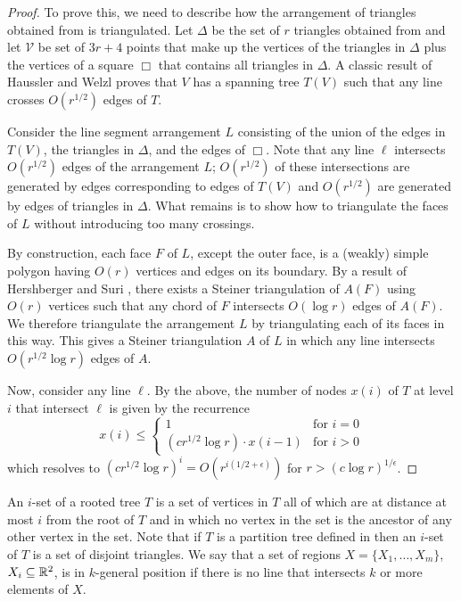 \documentclass{patmorin}
\begin{document}
\begin{proof}
  To prove this, we need to describe how the arrangement of triangles
  obtained from  is triangulated.  Let $\Delta$
  be the set of $r$ triangles obtained from  and
  let $\mathcal{V}$ be set of $3r+4$ points that make up the vertices
  of the triangles in $\Delta$ plus the vertices of a square $\Box$ that
  contains all triangles in $\Delta$.  A classic result of Haussler and
  Welzl \cite{hw87} proves that $V$ has a spanning tree $T(V)$ such that
  any line crosses $O(r^{1/2})$ edges of $T$. 

  Consider the line segment arrangement $L$ consisting of the union of the
  edges in $T(V)$, the triangles in $\Delta$, and the edges of $\Box$.
  Note that any line $\ell$  intersects $O(r^{1/2})$ edges of the
  arrangement $L$; $O(r^{1/2})$ of these intersections are generated by
  edges corresponding to edges of $T(V)$ and $O(r^{1/2})$ are generated
  by edges of triangles in $\Delta$.  What remains is to show how to
  triangulate the faces of $L$ without introducing too many crossings.

  By construction, each face $F$ of $L$, except the outer face, is a
  (weakly) simple polygon having $O(r)$ vertices and edges on its
  boundary.  By a result of Hershberger and Suri \cite{hs95}, there
  exists a Steiner triangulation of $A(F)$ using $O(r)$ vertices such
  that any chord of $F$ intersects $O(\log r)$ edges of $A(F)$. We
  therefore triangulate the arrangement $L$ by triangulating each of
  its faces in this way.  This gives a Steiner triangulation $A$ of $L$
  in which any line intersects $O(r^{1/2}\log r)$ edges of $A$.

  Now, consider any line $\ell$. By the above, the number of nodes
  $x(i)$ of $T$ at level $i$ that intersect $\ell$ is given by
  the recurrence
  \[
     x(i)\le 
      \left\{
       \begin{array}{ll}
          1 & \mbox{for $i=0$} \\
          (cr^{1/2}\log r)\cdot x(i-1) & \mbox{for $i>0$}
       \end{array}
      \right.
\]
which resolves to $(cr^{1/2}\log r)^i= O(r^{i(1/2+\epsilon)})$ for 
$r>(c\log r)^{1/\epsilon}$.
\end{proof}

An $i$-set of a rooted tree $T$ is a set of vertices in $T$ all of
which are at distance at most $i$ from the root of $T$ and in which
no vertex in the set is the ancestor of any other vertex in the set.
Note that if $T$ is a partition tree defined in 
then an $i$-set of $T$ is a set of disjoint triangles.  We say that a set
of regions $X=\{X_1,\ldots,X_m\}$, $X_i\subseteq\mathbb{R}^2$, is in $k$-general
position if there is no line that intersects $k$ or more elements of $X$.
\end{document}
